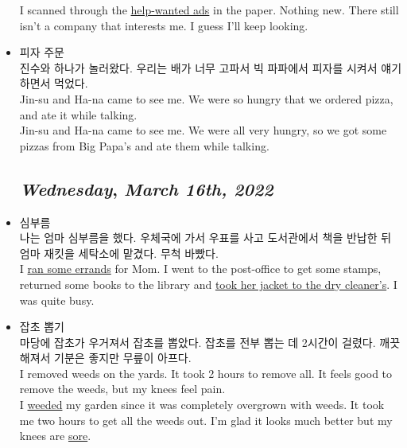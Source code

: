 \begin{itemize}
  I scanned through the \underline{help-wanted ads} in the paper. Nothing new. There still isn't a company that interests me. I guess I'll keep looking.\\
  
  \item 피자 주문\\
  
  진수와 하나가 놀러왔다. 우리는 배가 너무 고파서 빅 파파에서 피자를 시켜서 얘기하면서 먹었다.\\
  
  Jin-su and Ha-na came to see me. We were so hungry that we ordered pizza, and ate it while talking.\\
  
  Jin-su and Ha-na came to see me. We were all very hungry, so we got some pizzas from Big Papa's and ate them while talking.\\
  
\pagebreak
\def\day{\textit{March 16th, 2022}}
\def\weekday{\textit{Wednesday}}
\subsection*{\weekday, \day}
  
  \item 심부름\\
  
  나는 엄마 심부름을 했다. 우체국에 가서 우표를 사고 도서관에서 책을 반납한 뒤 엄마 재킷을 세탁소에 맡겼다. 무척 바빴다.\\
  
  I \underline{ran some errands} for Mom. I went to the post-office to get some stamps, returned some books to the library and \underline{took her jacket to the dry cleaner's}. I was quite busy.\\
  
  \item 잡초 뽑기\\
  
  마당에 잡초가 우거져서 잡초를 뽑았다. 잡초를 전부 뽑는 데 2시간이 걸렸다. 깨끗해져서 기분은 좋지만 무릎이 아프다.\\
  
  I removed weeds on the yards. It took 2 hours to remove all. It feels good to remove the weeds, but my knees feel pain.\\
  
  I \underline{weeded} my garden since it was completely overgrown with weeds. It took me two hours to get all the weeds out. I'm glad it looks much better but my knees are \underline{sore}.\\
  

\end{itemize}
